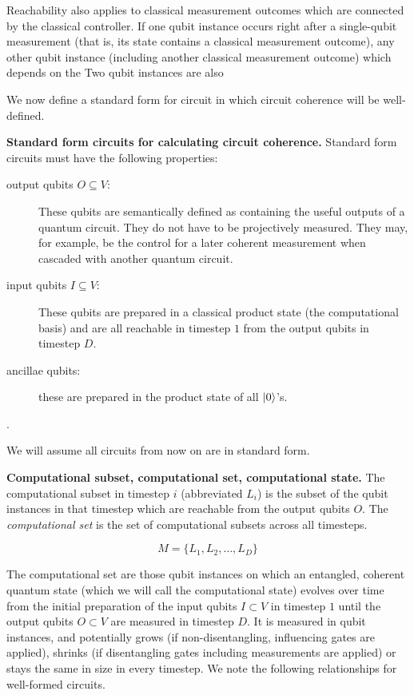 Reachability also applies to classical measurement outcomes which are
connected by the classical controller.
If one qubit instance occurs right after a single-qubit measurement
(that is, its state contains a classical measurement outcome), any other
qubit instance (including another classical measurement outcome) which
depends on the
Two qubit instances are also 


We now define a standard form for circuit in which circuit coherence will be
well-defined.

\begin{definition}{\textbf{Standard form circuits for calculating circuit coherence.}}
Standard form circuits must have the following properties:

\begin{description}
\item[output qubits $O \subseteq V$:] These qubits are semantically defined as
containing the useful outputs of a quantum circuit. They do not have to be
projectively measured. They may, for example, be the control for a
later coherent measurement when cascaded with another quantum circuit.
\item[input qubits $I \subseteq V$:] These qubits are prepared in a 
classical product state (the computational basis)
and are all reachable in timestep $1$ from the
output qubits in timestep $D$.
\item[ancillae qubits:] these are prepared in the product state of all $\left\vert{0}\right\rangle$'s.
\end{description}
\end{definition}.

We will assume all circuits from now on are in standard form.

\begin{definition}{\textbf{Computational subset, computational set, computational state.}}
The computational subset in timestep $i$ (abbreviated $L_i$) is the subset of
the qubit instances in that timestep
which are reachable from the output qubits $O$.
The \emph{computational set} is the set of computational subsets across
all timesteps.

\begin{equation}
M = \{L_1, L_2, \ldots, L_D \}
\end{equation}
\end{definition}

The computational set are those qubit instances on which an entangled, coherent
quantum state (which we will call the computational state) evolves over time from
the initial preparation of the input qubits $I \subset V$ in timestep $1$
until the output qubits $O \subset V$ are
measured in timestep $D$.
It is measured in qubit instances,
and potentially grows (if non-disentangling, influencing gates are applied), shrinks
(if disentangling gates including measurements are applied) or stays the same in size
in every timestep. We note the following
relationships for well-formed circuits.


